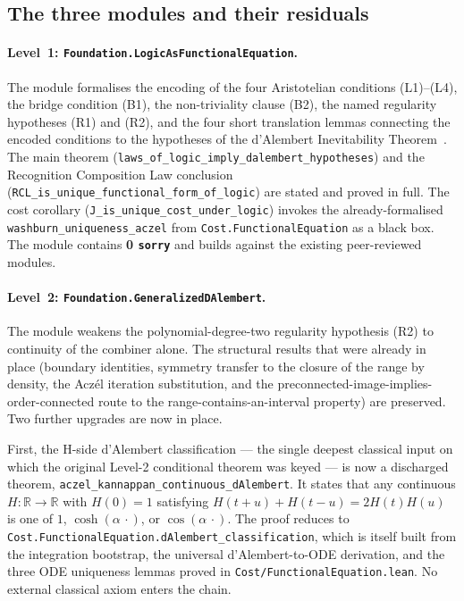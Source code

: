 \documentclass[11pt,a4paper]{article}
\theoremstyle{definition}
\theoremstyle{remark}
\begin{document}
\subsection{The three modules and their residuals}\label{app:modules}

\paragraph{Level~1: \texttt{Foundation.LogicAsFunctionalEquation}.}
The module formalises the encoding of the four Aristotelian conditions
(L1)--(L4), the bridge condition (B1), the non-triviality clause (B2),
the named regularity hypotheses (R1) and (R2), and the four short
translation lemmas connecting the encoded conditions to the
hypotheses of the d'Alembert Inevitability
Theorem~\cite{WashburnZlatanovicAllahyarov2026}. The main theorem
(\texttt{laws\_of\_logic\_imply\_dalembert\_hypotheses}) and the
Recognition Composition Law conclusion
(\texttt{RCL\_is\_unique\_functional\_form\_of\_logic}) are stated and
proved in full. The cost corollary
(\texttt{J\_is\_unique\_cost\_under\_logic}) invokes the
already-formalised \texttt{washburn\_uniqueness\_aczel} from
\texttt{Cost.FunctionalEquation} as a black box. The module contains
\textbf{0 \texttt{sorry}} and builds against the existing
peer-reviewed~\cite{WashburnZlatanovicAllahyarov2026,
WashburnZlatanovic2026} modules.

\paragraph{Level~2: \texttt{Foundation.GeneralizedDAlembert}.}
The module weakens the polynomial-degree-two regularity hypothesis
(R2) to continuity of the combiner alone. The structural results that
were already in place (boundary identities, symmetry transfer to the
closure of the range by density, the Acz\'el iteration substitution,
and the preconnected-image-implies-order-connected route to the
range-contains-an-interval property) are preserved. Two further
upgrades are now in place.

First, the H-side d'Alembert classification — the single deepest
classical input on which the original Level-2 conditional theorem was
keyed — is now a discharged theorem,
\texttt{aczel\_kannappan\_continuous\_dAlembert}. It states that any
continuous $H : \mathbb{R} \to \mathbb{R}$ with $H(0) = 1$ satisfying
$H(t + u) + H(t - u) = 2 H(t) H(u)$ is one of $1$, $\cosh(\alpha\,\cdot)$,
or $\cos(\alpha\,\cdot)$. The proof reduces to
\texttt{Cost.FunctionalEquation.dAlembert\_classification}, which is
itself built from the integration bootstrap, the universal
d'Alembert-to-ODE derivation, and the three ODE uniqueness lemmas
proved in \texttt{Cost/FunctionalEquation.lean}. No external classical
axiom enters the chain.
\end{document}
